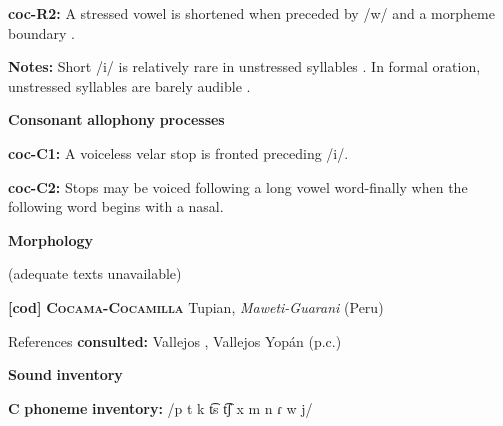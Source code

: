 \begin{styleBody}
\textbf{coc-R2:} A stressed vowel is shortened when preceded by /w/ and a morpheme boundary \citep[67]{Bendixen1980}.
\end{styleBody}

\begin{styleBody}
\textbf{Notes:} Short /i/ is relatively rare in unstressed syllables \citep[32]{Crawford1966}. In formal oration, unstressed syllables are barely audible \citep[332-3]{Bendixen1980}.
\end{styleBody}

\begin{styleBody}
\textbf{Consonant} \textbf{allophony} \textbf{processes}
\end{styleBody}

\begin{styleBody}
\textbf{coc-C1:} A voiceless velar stop is fronted preceding /i/. \citep[15]{Crawford1966}
\end{styleBody}

\begin{styleBody}
\textbf{coc-C2:} Stops may be voiced following a long vowel word-finally when the following word begins with a nasal. \citep[99-100]{Bendixen1980}
\end{styleBody}

\begin{styleBody}
\textbf{Morphology}
\end{styleBody}

\begin{styleBody}
(adequate texts unavailable)
\end{styleBody}

\begin{styleBody}
\textbf{[cod]}   \textbf{\textsc{Cocama-Cocamilla}}  Tupian, \textit{Maweti-Guarani} (Peru)
\end{styleBody}

\begin{styleBody}
References \textbf{consulted:} Vallejos \citet{Yopán2010}, Vallejos Yopán (p.c.)
\end{styleBody}

\begin{styleBody}
\textbf{Sound} \textbf{inventory}
\end{styleBody}

\begin{styleBody}
\textbf{C} \textbf{phoneme} \textbf{inventory:} /p t k t͡s t͡ʃ x m n ɾ w j/
\end{styleBody}

